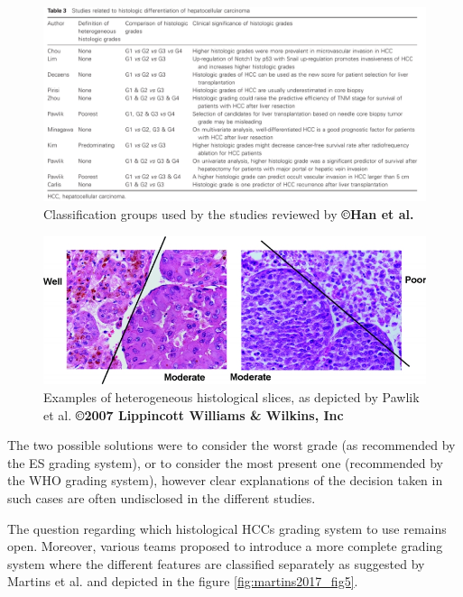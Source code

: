 \documentclass[]{article}
\begin{document}
\begin{figure}[th!]
\centering
\includegraphics[width=0.95\linewidth]{images/image9}
\caption{Classification groups used by the studies reviewed by \textbf{©Han et al.} \cite{Han2013}}
\label{fig:han2013_table3}
\end{figure}


\begin{figure}[th!]
\centering
\includegraphics[width=0.7\linewidth]{images/pawlik_fig4}
\caption{Examples of heterogeneous histological slices, as depicted by Pawlik et al. \cite{Pawlik2007} \textbf{©2007 Lippincott Williams \& Wilkins, Inc}}
\label{fig:pawlik_fig4}
\end{figure}


The two possible solutions were to consider the worst grade (as
recommended by the ES grading system), or to consider the most present
one (recommended by the WHO grading system), however clear explanations
of the decision taken in such cases are often undisclosed in the
different studies.

The question regarding which histological HCCs grading system to use
remains open. Moreover, various teams proposed to introduce a more
complete grading system where the different features are classified
separately as suggested by Martins et al. and depicted in the
figure \ref{fig:martins2017_fig5}.
\end{document}
